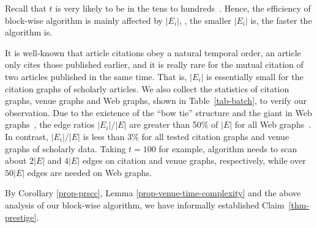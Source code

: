  Recall that $t$ is very likely to be in the tens to hundreds~\cite{Brin98:PageRank}. 
 Hence, the efficiency of block-wise algorithm \twprscc is mainly affected by $|E_i|$, \ie, the smaller $|E_i|$ is, the faster the algorithm is.




It is well-known that article citations obey a natural temporal order, \ie an article only cites those published earlier, and it is really rare for the mutual citation of two articles published in the same time. That is, $|E_i|$ is essentially small for the citation graphs of scholarly articles.
%
We also collect the statistics of citation graphs, venue graphs and Web graphs, shown in Table~\ref{tab-batch}, to verify our observation.
Due to the existence of the ``bow tie'' structure and the giant \scc in Web graphs~\cite{BroderKMRRSTW00}, the edge ratios $|E_i|/|E|$ are greater than 50\% of $|E|$ for all Web graphs~\cite{LeskovecLDM09}. In contrast, $|E_i|/|E|$ is less than 3\% for all tested citation graphs and venue graphs of scholarly data.
%
Taking $t=100$ for example, algorithm \twprscc needs to scan about $2|E|$ and $4|E|$ edges on citation and venue graphs, respectively, while over $50|E|$ edges are needed on Web graphs.


By Corollary \ref{prop-prscc}, Lemma \ref{prop-venue-time-complexity} and the  above analysis of our block-wise algorithm, we have informally established Claim~\ref{thm-prestige}.





